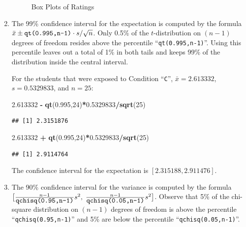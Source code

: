 \documentclass[]{krantz}
\makeatletter
\newenvironment{Shaded}{\begin{snugshade}}{\end{snugshade}}
\newcommand{\KeywordTok}[1]{\textcolor[rgb]{0.13,0.29,0.53}{\textbf{#1}}}
\newcommand{\DecValTok}[1]{\textcolor[rgb]{0.00,0.00,0.81}{#1}}
\newcommand{\FloatTok}[1]{\textcolor[rgb]{0.00,0.00,0.81}{#1}}
\newcommand{\StringTok}[1]{\textcolor[rgb]{0.31,0.60,0.02}{#1}}
\newcommand{\OperatorTok}[1]{\textcolor[rgb]{0.81,0.36,0.00}{\textbf{#1}}}
\newcommand{\NormalTok}[1]{#1}
\newenvironment{kframe}{%
\medskip{}
\setlength{\fboxsep}{.8em}
 \def\at@end@of@kframe{}%
 \ifinner\ifhmode%
  \def\at@end@of@kframe{\end{minipage}}%
  \begin{minipage}{\columnwidth}%
 \fi\fi%
 \def\FrameCommand##1{\hskip\@totalleftmargin \hskip-\fboxsep
 \colorbox{shadecolor}{##1}\hskip-\fboxsep
     \hskip-\linewidth \hskip-\@totalleftmargin \hskip\columnwidth}%
 \MakeFramed {\advance\hsize-\width
   \@totalleftmargin\z@ \linewidth\hsize
   \@setminipage}}%
 {\par\unskip\endMakeFramed%
 \at@end@of@kframe}
\renewenvironment{Shaded}{\begin{kframe}}{\end{kframe}}
\theoremstyle{definition}
\theoremstyle{definition}
\theoremstyle{definition}
\theoremstyle{remark}
\makeatother
\begin{document}
\begin{enumerate}
\begin{figure}
{  }

  \caption{Box Plots of Ratings}\label{fig:Confidence2}
  \end{figure}
\item
  The 99\% confidence interval for the expectation is computed by the
  formula \(\bar x \pm \mbox{\texttt{qt(0.995,n-1)}} \cdot s/\sqrt{n}\).
  Only 0.5\% of the \(t\)-distribution on \((n-1)\) degrees of freedom
  resides above the percentile ``\texttt{qt(0.995,n-1)}''. Using this
  percentile leaves out a total of 1\% in both tails and keeps 99\% of
  the distribution inside the central interval.

  For the students that were exposed to Condition ``\texttt{C}'',
  \(\bar x = 2.613332\), \(s = 0.5329833\), and \(n = 25\):

\begin{Shaded}
\begin{Highlighting}[]
\FloatTok{2.613332} \OperatorTok{-}\StringTok{ }\KeywordTok{qt}\NormalTok{(}\FloatTok{0.995}\NormalTok{,}\DecValTok{24}\NormalTok{)}\OperatorTok{*}\FloatTok{0.5329833}\OperatorTok{/}\KeywordTok{sqrt}\NormalTok{(}\DecValTok{25}\NormalTok{)}
\end{Highlighting}
\end{Shaded}

\begin{verbatim}
## [1] 2.3151876
\end{verbatim}

\begin{Shaded}
\begin{Highlighting}[]
\FloatTok{2.613332} \OperatorTok{+}\StringTok{ }\KeywordTok{qt}\NormalTok{(}\FloatTok{0.995}\NormalTok{,}\DecValTok{24}\NormalTok{)}\OperatorTok{*}\FloatTok{0.5329833}\OperatorTok{/}\KeywordTok{sqrt}\NormalTok{(}\DecValTok{25}\NormalTok{)}
\end{Highlighting}
\end{Shaded}

\begin{verbatim}
## [1] 2.9114764
\end{verbatim}

  The confidence interval for the expectation is
  \([2.315188, 2.911476]\).
\item
  The 90\% confidence interval for the variance is computed by the
  formula
  \(\big[\frac{n-1}{\mbox{\texttt{qchisq(0.95,n-1)}}} s^2 ,\;\frac{n-1}{\mbox{\texttt{qchisq(0.05,n-1)}}} s^2\big]\).
  Observe that 5\% of the chi-square distribution on \((n-1)\) degrees
  of freedom is above the percentile ``\texttt{qchisq(0.95,n-1)}'' and
  5\% are below the percentile ``\texttt{qchisq(0.05,n-1)}''.


\end{enumerate}
\end{document}
